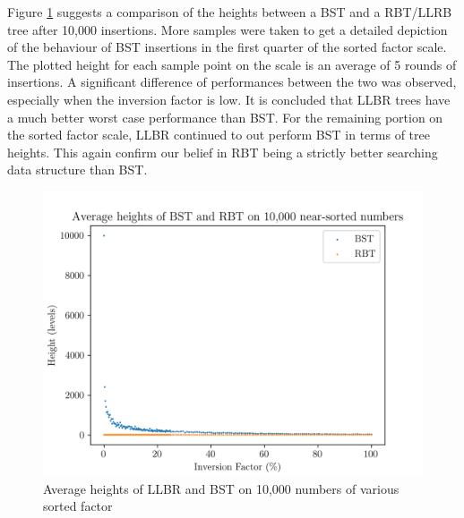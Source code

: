 \documentclass[titlepage, 12pt]{article}
\begin{document}
Figure \ref{fig:near} suggests a comparison of the heights between a BST and a
RBT/LLRB tree after 10,000 insertions. More samples were taken to get a detailed
depiction of the behaviour of BST insertions in the first quarter of the sorted
factor scale. The plotted height for each sample point on the scale is an
average of 5 rounds of insertions. A significant difference of performances
between the two was observed, especially when the inversion factor is low. It is
concluded that LLBR trees have a much better worst case performance than BST.
For the remaining portion on the sorted factor scale, LLBR continued to out
perform BST in terms of tree heights. This again confirm our belief in RBT being
a strictly better searching data structure than BST.
\begin{figure}[h]
  \centering
  \includegraphics[width=0.8\linewidth]{near} 
  \caption{Average heights of LLBR and BST on 10,000 numbers of various sorted factor}
  \label{fig:near}
\end{figure}
\end{document}
